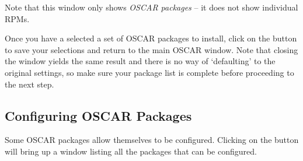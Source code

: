 {  Note that this window only shows {\em OSCAR packages} -- it does not
  show individual RPMs.
  
  Once you have a selected a set of OSCAR packages to install, click
\begchange
  on the  button to save your selections and
  return to the main OSCAR window.  Note that closing the window yields
  the same result and there is no way of `defaulting' to the original
  settings, so make sure your package list is complete before proceeding to 
  the next step.
\endchange

} %


\subsection{Configuring OSCAR Packages}
\label{det:configure-packages}

\optional

Some OSCAR packages allow themselves to be configured.  Clicking on
the  button will bring up a
window listing all the packages that can be configured.

